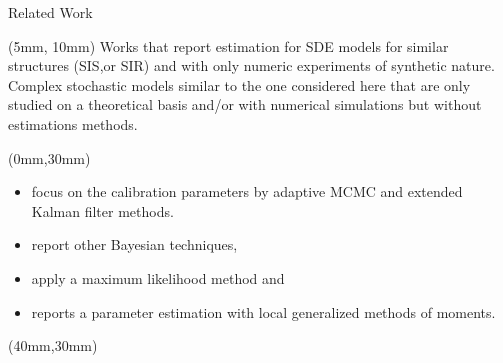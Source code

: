 \begin{bibunit}[plain]
	\begin{frame}{Related Work}
		
		\begin{textblock*}{120mm}(5mm, 10mm)
				Works that report estimation for SDE models for similar structures (SIS,or SIR) and  with only numeric experiments of synthetic nature. Complex stochastic models similar to the one considered here that are only studied on a theoretical basis and/or with numerical simulations but without estimations methods.	
		\end{textblock*}
		\begin{textblock*}{40mm}(0mm,30mm)
			\small{
			\begin{itemize}[label = $\dagger$]
				\item 
					\cite{Ndanguza2016} focus on the 
					calibration parameters 
					by adaptive MCMC and extended Kalman filter methods. 
				\item
					\cite{Hotta2010}
					report other Bayesian techniques, 
				\item \cite{Rios2021}
					apply a maximum likelihood method and
				\item
					\cite{Otunuga2021} 
					reports a parameter estimation with 
					local generalized methods of moments.
			\end{itemize}
			}
		\end{textblock*}
		\begin{textblock*}{90mm}(40mm,30mm)
		\end{textblock*}
	\end{frame}
\end{bibunit}
